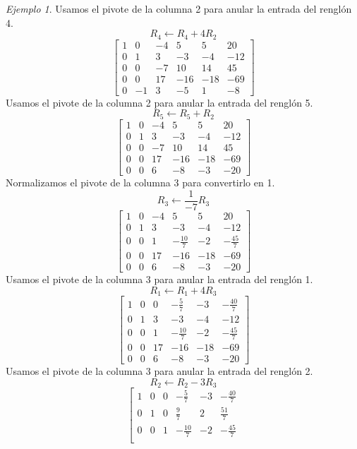 \documentclass[12pt]{article}
\theoremstyle{remark}
\newtheorem{Ejem}[definicion]{Ejemplo}
\begin{document}
\begin{Ejem}
 Usamos el pivote de la columna 2 para anular la entrada del renglón 4.
\[
R_{4}\leftarrow R_{4}+4R_{2}
\]
\[
\left[\begin{array}{ccccc|c}
1 & 0 & -4 & 5 & 5 & 20\\
0 & 1 & 3 & -3 & -4 & -12\\
0 & 0 & -7 & 10 & 14 & 45\\
0 & 0 & 17 & -16 & -18 & -69\\
0 & -1 & 3 & -5 & 1 & -8
\end{array}\right]
\]
Usamos el pivote de la columna 2 para anular la entrada del renglón 5.
\[
R_{5}\leftarrow R_{5}+R_{2}
\]
\[
\left[\begin{array}{ccccc|c}
1 & 0 & -4 & 5 & 5 & 20\\
0 & 1 & 3 & -3 & -4 & -12\\
0 & 0 & -7 & 10 & 14 & 45\\
0 & 0 & 17 & -16 & -18 & -69\\
0 & 0 & 6 & -8 & -3 & -20
\end{array}\right]
\]
Normalizamos el pivote de la columna 3 para convertirlo en 1.
\[
R_{3}\leftarrow \frac{1}{-7}R_{3}
\]
\[
\left[\begin{array}{ccccc|c}
1 & 0 & -4 & 5 & 5 & 20\\
0 & 1 & 3 & -3 & -4 & -12\\
0 & 0 & 1 & - \frac{10}{7} & -2 & - \frac{45}{7}\\
0 & 0 & 17 & -16 & -18 & -69\\
0 & 0 & 6 & -8 & -3 & -20
\end{array}\right]
\]
Usamos el pivote de la columna 3 para anular la entrada del renglón 1.
\[
R_{1}\leftarrow R_{1}+4R_{3}
\]
\[
\left[\begin{array}{ccccc|c}
1 & 0 & 0 & - \frac{5}{7} & -3 & - \frac{40}{7}\\
0 & 1 & 3 & -3 & -4 & -12\\
0 & 0 & 1 & - \frac{10}{7} & -2 & - \frac{45}{7}\\
0 & 0 & 17 & -16 & -18 & -69\\
0 & 0 & 6 & -8 & -3 & -20
\end{array}\right]
\]
 Usamos el pivote de la columna 3 para anular la entrada del renglón 2.
\[
R_{2}\leftarrow R_{2}-3R_{3}
\]
\[
\left[\begin{array}{ccccc|c}
1 & 0 & 0 & - \frac{5}{7} & -3 & - \frac{40}{7}\\
0 & 1 & 0 & \frac{9}{7} & 2 & \frac{51}{7}\\
0 & 0 & 1 & - \frac{10}{7} & -2 & - \frac{45}{7}\\

\end{array}\]
\end{Ejem}
\end{document}
